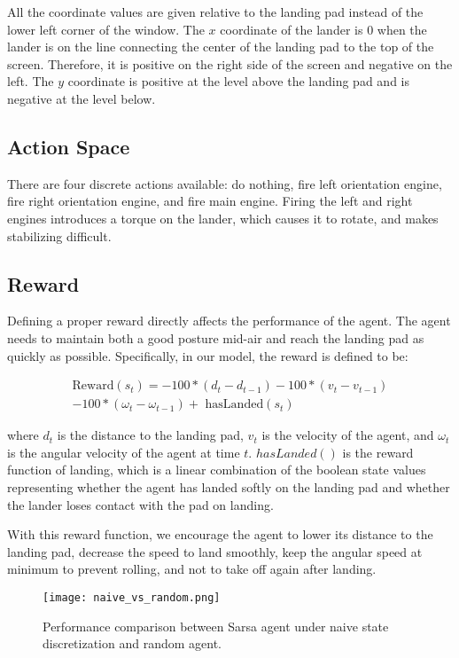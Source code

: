 \documentclass[10pt, conference]{IEEEtran}
\begin{document}
All the coordinate values are given relative to the landing pad instead of the lower left corner of the window. The $x$ coordinate of the lander is $0$ when the lander is on the line connecting the center of the landing pad to the top of the screen. Therefore, it is positive on the right side of the screen and negative on the left. The $y$ coordinate is positive at the level above the landing pad and is negative at the level below.

\subsection{Action Space}
There are four discrete actions available: do nothing, fire left orientation engine, fire right orientation engine, and fire main engine. Firing the left and right engines introduces a torque on the lander, which causes it to rotate, and makes stabilizing difficult.

\subsection{Reward}
Defining a proper reward directly affects the performance of the agent. The agent needs to maintain both a good posture mid-air and reach the landing pad as quickly as possible. Specifically, in our model, the reward is defined to be:

\begin{equation}
\begin{split}
    \text{Reward}(s_t) = -100* (d_t - d_{t-1}) - 100* (v_t - v_{t-1})\\ -100* (\omega_t - \omega_{t-1}) + \text{ hasLanded}(s_t)
\end{split} 
\end{equation}

where $d_t$ is the distance to the landing pad, $v_t$ is the velocity of the agent, and $\omega_t$ is the angular velocity of the agent at time $t$. $hasLanded()$ is the reward function of landing, which is a linear combination of the boolean state values representing whether the agent has landed softly on the landing pad and whether the lander loses contact with the pad on landing. 

With this reward function, we encourage the agent to lower its distance to the landing pad, decrease the speed to land smoothly, keep the angular speed at minimum to prevent rolling, and not to take off again after landing.

\begin{figure}[!t]
    \centering
    \texttt{[image: naive\_vs\_random.png]}
    \caption{Performance comparison between Sarsa agent under naive state discretization and random agent.}
    \label{fig:naivesarsavsrandom}
\end{figure}
\end{document}
